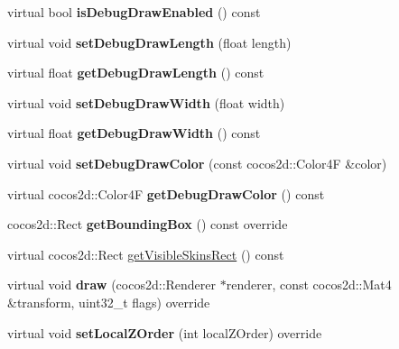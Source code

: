 \begin{DoxyCompactItemize}
virtual bool {\bfseries is\+Debug\+Draw\+Enabled} () const
\item 
\mbox{\label{classBoneNode_aec01f1c34542b07ceaa8164f8e316951}} 
virtual void {\bfseries set\+Debug\+Draw\+Length} (float length)
\item 
\mbox{\label{classBoneNode_a55015c7384cdf96dbedd4d8fe1d329a8}} 
virtual float {\bfseries get\+Debug\+Draw\+Length} () const
\item 
\mbox{\label{classBoneNode_a68e695ac08c0149506ac537469b664eb}} 
virtual void {\bfseries set\+Debug\+Draw\+Width} (float width)
\item 
\mbox{\label{classBoneNode_abf53e86c3cd79e8e8fa0276e939adfd5}} 
virtual float {\bfseries get\+Debug\+Draw\+Width} () const
\item 
\mbox{\label{classBoneNode_a50624b44ed0c903823058f9ac43c4946}} 
virtual void {\bfseries set\+Debug\+Draw\+Color} (const cocos2d\+::\+Color4F \&color)
\item 
\mbox{\label{classBoneNode_a413a53b0540e9f74f83a4dfac2ebfb00}} 
virtual cocos2d\+::\+Color4F {\bfseries get\+Debug\+Draw\+Color} () const
\item 
\mbox{\label{classBoneNode_ad928c8e12a7c7cdbb965498d50d1d3ca}} 
cocos2d\+::\+Rect {\bfseries get\+Bounding\+Box} () const override
\item 
virtual cocos2d\+::\+Rect \hyperlink{classBoneNode_aba6034b071dcce0ee5d2afdb440bf5e5}{get\+Visible\+Skins\+Rect} () const
\item 
\mbox{\label{classBoneNode_a91a631e11f37bb27c3b15e9c3c487ab7}} 
virtual void {\bfseries draw} (cocos2d\+::\+Renderer $\ast$renderer, const cocos2d\+::\+Mat4 \&transform, uint32\+\_\+t flags) override
\item 
\mbox{\label{classBoneNode_a3b878806322d39a1af103463deacbf3d}} 
virtual void {\bfseries set\+Local\+Z\+Order} (int local\+Z\+Order) override
\item 
\mbox{\label{classBoneNode_aff3e4f4589ed53932216378a57e580e0}} 

\end{DoxyCompactItemize}

